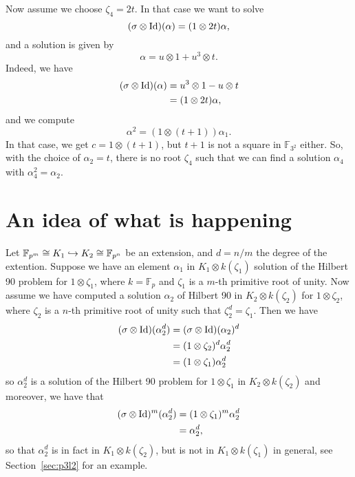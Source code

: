 \documentclass[a4paper,11pt]{article}
\begin{document}
Now assume we choose $\zeta_4=2t$. In that case we want to solve
\[
  (\sigma\otimes\operatorname{Id})(\alpha) = (1\otimes 2t)\alpha,
\]
and a solution is given by 
\[
  \alpha = u\otimes1 + u^3\otimes t.
\]
Indeed, we have
\begin{align*}
  (\sigma\otimes\operatorname{Id})(\alpha) &= u^3\otimes1-u\otimes t \\
  &= (1\otimes 2t)\alpha,
\end{align*}
and we compute
\[
  \alpha^2 = (1\otimes (t+1))\alpha_1.
\]
In that case, we get $c=1\otimes(t+1)$, but $t+1$ is not a square in
$\mathbb{F}_{3^2}$ either. So, with the choice of $\alpha_2=t$, there is no root
$\zeta_4$ such that we can find a solution $\alpha_4$ with
$\alpha_4^2=\alpha_2$.

\section{An idea of what is happening}
Let $\mathbb{F}_{p^m}\cong K_1\hookrightarrow K_2\cong \mathbb{F}_{p^n}$ be an extension,
and $d=n/m$ the degree of the extention. Suppose we have an element $\alpha_1$ in $K_1\otimes k(\zeta_1)$ solution of
the Hilbert 90 problem for $1\otimes\zeta_1$, where
$k=\mathbb{F}_p$ and $\zeta_1$ is a $m$-th primitive root of unity. Now assume
we have computed a solution $\alpha_2$ of Hilbert 90 in $K_2\otimes k(\zeta_2)$ for
$1\otimes\zeta_2$, where $\zeta_2$ is a $n$-th primitive root of unity such that
$\zeta_2^d=\zeta_1$. Then we have 
\begin{align*}
  (\sigma\otimes\operatorname{Id})(\alpha_2^d) &= (\sigma\otimes\operatorname{Id})(\alpha_2)^d \\
  &= (1\otimes\zeta_2)^d\alpha_2^d \\
  &= (1\otimes\zeta_1)\alpha_2^d
\end{align*}
so $\alpha_2^d$ is a solution of the Hilbert 90 problem for $1\otimes\zeta_1$ in
$K_2\otimes k(\zeta_2)$ and moreover, we have that
\begin{align*}
  (\sigma\otimes\operatorname{Id})^m(\alpha_2^d) &= (1\otimes\zeta_1)^m\alpha_2^d \\
  &= \alpha_2^d,
\end{align*}
so that $\alpha_2^d$ is in fact in $K_1\otimes k(\zeta_2)$, but is not in
$K_1\otimes k(\zeta_1)$ in general, see Section~\ref{sec:p3l2} for an example.
\end{document}

